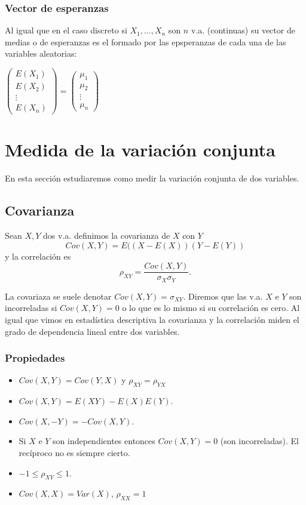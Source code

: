 \documentclass[12pt]{report}
\begin{document}
    \subsubsection{Vector de esperanzas}

    Al igual que en el caso discreto si $X_{1},\ldots,X_{n}$ son $n$ v.a.
    (continuas) su vector de medias o de esperanzas es el formado por las epsperanzas de
    cada una de las variables aleatorias:

    $\left(\begin{array}{c}
    E(X_{1})\\
    E(X_{2})\\
    \vdots\\
    E(X_{n})
    \end{array}\right)=\left(\begin{array}{c}
    \mu_{1}\\
    \mu_{2}\\
    \vdots\\
        \mu_{n}
    \end{array}\right)$


    \section{Medida de la variación conjunta}

    En esta sección estudiaremos como medir la variación conjunta
    de dos variables.

    \subsection{Covarianza}
    Sean $X,Y$ dos v.a.
    definimos la covarianza de $X$ con $Y$ $$Cov(X,Y)=E((X-E(X))(Y-E(Y))$$
    y la correlación es $$\rho_{XY}=\frac{Cov(X,Y)}{\sigma_{X}\sigma_{Y}}.$$

La covariaza se suele denotar $Cov(X,Y)=\sigma_{X Y}$. Diremos que las v.a. $X$ e $Y$ son
incorreladas si $Cov(X,Y)=0$ o lo que es lo mismo si su correlación es cero. Al igual que
vimos en estadística descriptiva la covarianza y la correlación miden el grado de
dependencia lineal entre dos variables.

    \subsubsection{Propiedades}

    \begin{itemize}
    \item $Cov(X,Y)=Cov(Y,X)$ y $\rho_{X Y}=\rho_{Y X}$
    \item $Cov(X,Y)= E(X Y)-E(X)E(Y).$
    \item $Cov(X,-Y)=-Cov(X,Y).$
    \item Si $X$ e $Y$ son independientes entonces
    $Cov(X,Y)=0$ (son incorreladas). El recíproco no es siempre cierto.
    \item $-1\leq \rho_{X Y}\leq 1.$
    \item $Cov(X,X)=Var(X)$, $\rho_{X X}=1$
    \end{itemize}
\end{document}
